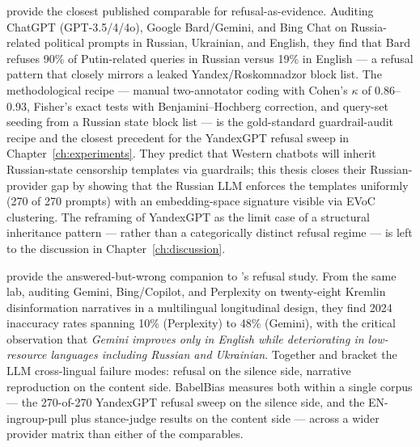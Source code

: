 {\sloppy
\citet{urman2025silence} provide the closest published comparable for
refusal-as-evidence. Auditing ChatGPT (GPT-3.5/4/4o), Google
Bard/Gemini, and Bing Chat on Russia-related political prompts in
Russian, Ukrainian, and English, they find that Bard refuses 90\% of
Putin-related queries in Russian versus 19\% in English --- a refusal
pattern that closely mirrors a leaked Yandex/Roskomnadzor block list.
The methodological recipe --- manual two-annotator coding with Cohen's
$\kappa$ of 0.86--0.93, Fisher's exact tests with Benjamini--Hochberg
correction, and query-set seeding from a Russian state block list ---
is the gold-standard guardrail-audit recipe and the closest precedent
for the YandexGPT refusal sweep in Chapter~\ref{ch:experiments}. They
predict that Western chatbots will inherit Russian-state censorship
templates via guardrails; this thesis closes their Russian-provider gap
by showing that the Russian LLM enforces the templates uniformly (270
of 270 prompts) with an embedding-space signature visible via EVoC
clustering. The reframing of YandexGPT as the limit case of a
structural inheritance pattern --- rather than a categorically distinct
refusal regime --- is left to the discussion in
Chapter~\ref{ch:discussion}.\par}

\citet{makhortykh2024warriors} provide the answered-but-wrong companion
to \citet{urman2025silence}'s refusal study. From the same lab,
auditing Gemini, Bing/Copilot, and Perplexity on twenty-eight Kremlin
disinformation narratives in a multilingual longitudinal design, they
find 2024 inaccuracy rates spanning 10\% (Perplexity) to 48\% (Gemini),
with the critical observation that \emph{Gemini improves only in
English while deteriorating in low-resource languages including
Russian and Ukrainian}. Together \citet{urman2025silence} and
\citet{makhortykh2024warriors} bracket the LLM cross-lingual failure
modes: refusal on the silence side, narrative reproduction on the
content side. BabelBias measures both within a single corpus --- the
270-of-270 YandexGPT refusal sweep on the silence side, and
the EN-ingroup-pull plus stance-judge results on the content side ---
across a wider provider matrix than either of the comparables.

